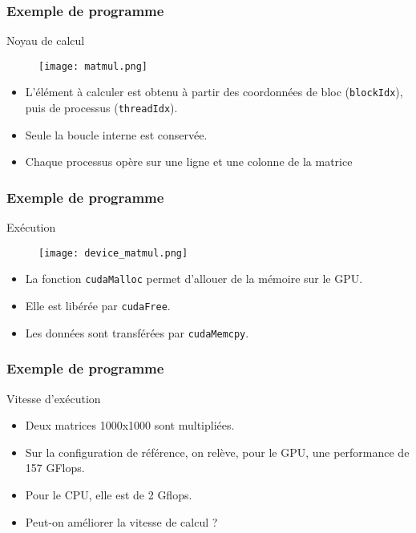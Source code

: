 \begin{frame}
    \frametitle{Exemple de programme}
\begin{block}{Noyau de calcul}
   \begin{figure}
    \centering
   \texttt{[image: matmul.png]}
   \end{figure}
   \begin{itemize}
    \item<+-> L'élément à calculer est obtenu à partir des coordonnées de bloc (\texttt{blockIdx}), puis de processus
    (\texttt{threadIdx}).
    \item<+-> Seule la boucle interne est conservée.
    \item<+-> Chaque processus opère sur une ligne et une colonne de la matrice
   \end{itemize}
\end{block}
\end{frame}

\begin{frame}
    \frametitle{Exemple de programme}
\begin{block}{Exécution}
   \begin{figure}
    \centering
   \texttt{[image: device\_matmul.png]}
   \end{figure}
   \footnotesize
   \begin{itemize}
    \item<+-> La fonction \texttt{cudaMalloc} permet d'allouer de la mémoire sur le GPU.
    \item<+-> Elle est libérée par \texttt{cudaFree}.
    \item<+-> Les données sont transférées par \texttt{cudaMemcpy}.
   \end{itemize}
\end{block}
\end{frame}

\begin{frame}
    \frametitle{Exemple de programme}
\begin{block}{Vitesse d'exécution}
   \begin{itemize}
    \item<+-> Deux matrices 1000x1000 sont multipliées.
    \item<+-> Sur la configuration de référence, on relève, pour le GPU, une performance de 157 GFlops.
    \item<+-> Pour le CPU, elle est de 2 Gflops.
    \item<+-> Peut-on améliorer la vitesse de calcul ?
   \end{itemize}
\end{block}
\end{frame}

